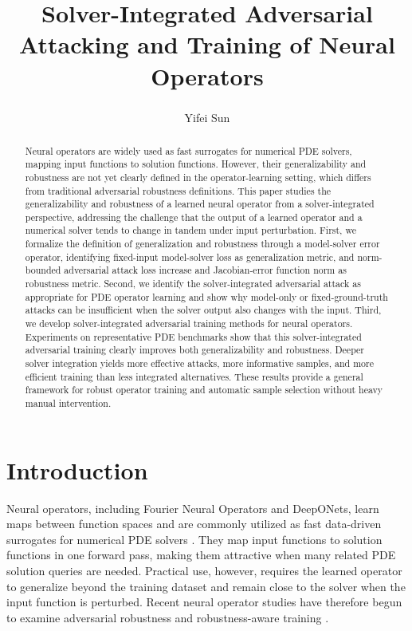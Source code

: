 \documentclass[letterpaper]{article} %
\title{Solver-Integrated Adversarial Attacking and Training of Neural Operators}
\author{
  Yifei Sun\textsuperscript{\dag}
}
\begin{document}
\maketitle
\thispagestyle{plain}
\pagestyle{plain}
\begingroup
\renewcommand{\thefootnote}{\fnsymbol{footnote}}
\endgroup
\begin{abstract}
Neural operators are widely used as fast surrogates for numerical PDE
solvers, mapping input functions to solution functions. However, their
generalizability and robustness are not yet clearly defined in the
operator-learning setting, which differs from traditional adversarial robustness
definitions. This paper studies the generalizability and robustness of a
learned neural operator from a solver-integrated perspective, addressing the
challenge that the output of a learned operator and a numerical solver tends to
change in tandem under input perturbation. First, we formalize the definition
of generalization and robustness through a model-solver error operator,
identifying fixed-input model-solver loss as generalization metric, and
norm-bounded adversarial attack loss increase and Jacobian-error function norm as
robustness metric. Second, we
identify the solver-integrated adversarial attack as appropriate
for PDE operator learning and show why model-only or fixed-ground-truth attacks
can be insufficient when the solver output also changes with the input. Third, we
develop solver-integrated adversarial training methods for neural operators.
Experiments on representative PDE benchmarks show that this solver-integrated
adversarial training clearly improves both generalizability and robustness.
Deeper solver integration yields more effective attacks, more informative
samples, and more efficient training than less integrated alternatives. These
results provide a general
framework for robust operator training and automatic sample selection without
heavy manual intervention.
\end{abstract}

\section{Introduction}

Neural operators, including Fourier Neural Operators and DeepONets, learn maps
between function spaces and are commonly utilized as fast data-driven
surrogates for numerical PDE solvers \citep{li2021fourier,lu2021deeponet}.
They map input functions to solution functions in one forward pass, making them
attractive when many related PDE solution queries are needed. Practical use, however,
requires the learned operator to generalize beyond the training dataset and
remain close to the solver when the input function is perturbed. Recent neural
operator studies have therefore begun to examine adversarial robustness and
robustness-aware training
\citep{adesoji2022evaluating,huang2026stablepdenet,roy2026beyond}.
\end{document}
